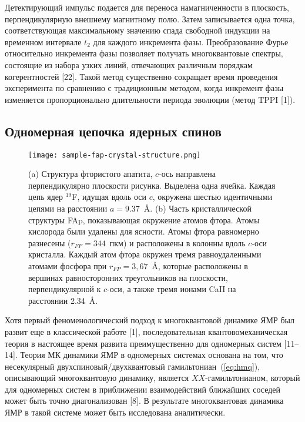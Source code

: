 Детектирующий импульс подается для переноса намагниченности в плоскость, перпендикулярную внешнему магнитному полю. Затем записывается одна точка, соответствующая максимальному значению спада свободной индукции на временном интервале $t_2$ для каждого инкремента фазы. Преобразование Фурье относительно инкремента фазы позволяет получать многоквантовые спектры, состоящие из набора узких линий, отвечающих различным порядкам когерентностей [22]. Такой метод существенно сокращает время проведения эксперимента по сравнению с традиционным методом, когда инкремент фазы изменяется пропорционально длительности периода эволюции (метод TPPI [1]).




\subsection{Одномерная цепочка ядерных спинов}

\begin{figure}[ht]
  \texttt{[image: sample-fap-crystal-structure.png]}
  \caption{
    (a) Структура фтористого апатита, $c$-ось направлена перпендикулярно плоскости рисунка.
    Выделена одна ячейка.
    Каждая цепь ядер $^{19}$F, идущая вдоль оси $c$, окружена шестью идентичными цепями на расстоянии $a=9.37$~\r{A}.
    (b) Часть кристаллической структуры FAp, показывающая окружение атомов фтора. Атомы кислорода были удалены для ясности.
    Атомы фтора равномерно разнесены ($r_{FF}=344$~пкм) и расположены в колонны вдоль $c$-оси кристалла.
    Каждый атом фтора окружен тремя равноудаленными атомами фосфора при $r_{FP}=3,67$~\r{A},
    которые расположены в вершинах равносторонних треугольников на плоскости,
    перпендикулярной к $c$-оси, а также тремя ионами CaII на расстоянии 2.34~\r{A}.
  }
  \label{fig:sample-fap-crystal-structure}
\end{figure}
Хотя первый феноменологический подход к многоквантовой динамике ЯМР был развит еще в классической работе [1],
последовательная квантовомеханическая теория в настоящее время развита преимущественно для одномерных систем [11–14].
Теория МК динамики ЯМР в одномерных системах основана на том,
что несекулярный двухспиновый/двухквантовый гамильтониан~(\ref{eq:hmq}),
описывающий многоквантовую динамику,
является $XX$-гамильтонианом,
который для одномерных систем в приближении взаимодействий ближайших соседей может быть точно диагонализован [8].
В результате многоквантовая динамика ЯМР в такой системе может быть исследована аналитически.

